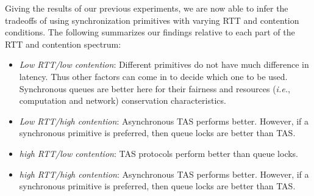 Giving the results of our previous experiments, we are now able to infer the tradeoffs of using synchronization primitives with varying RTT and contention conditions. The following summarizes our findings relative to each part of the RTT and contention spectrum:
\begin{itemize}
\item{\emph{Low RTT/low contention}: Different primitives do not have much difference in latency. Thus other factors can come in to decide which one to be used. Synchronous queues are better here for their fairness and resources (\emph{i.e.}, computation and network) conservation characteristics.}
\item{\emph{Low RTT/high contention}: Asynchronous TAS performs better. However, if a synchronous primitive is preferred, then queue locks are better than TAS.}
\item{\emph{high RTT/low contention}: TAS protocols perform better than queue locks. }
\item{\emph{high RTT/high contention}: Asynchronous TAS performs better. However, if a synchronous primitive is preferred, then queue locks are better than TAS.}
\end{itemize}















